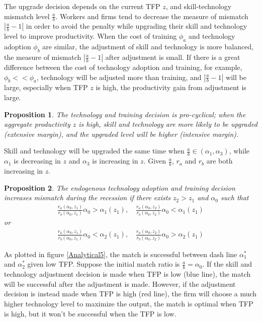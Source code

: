 \documentclass[12pt]{article}
\newtheorem{proposition}{Proposition}
\newcommand{\1}{\mathbb{1}}
\begin{document}
The upgrade decision depends on the current TFP $z$, and skill-technology mismatch level $\frac{a}{b}$. Workers and firms tend to decrease the measure of mismatch $|\frac{a}{b}-1|$ in order to avoid the penalty while upgrading their skill and technology level to improve productivity. When the cost of training $\phi_a$ and technology adoption $\phi_b$ are similar, the adjustment of skill and technology is more balanced, the measure of mismatch $|\frac{a}{b}-1|$ after adjustment is small. If there is a great difference between the cost of technology adoption and training, for example, $\phi_b<<\phi_a$, technology will be adjusted more than training, and $|\frac{a}{b}-1|$ will be large, especially when TFP $z$ is high, the productivity gain from adjustment is large.    

\begin{proposition}
The technology and training decision is pro-cyclical; when the aggregate productivity $z$ is high, skill and technology are more likely to be upgraded (extensive margin), and the upgraded level will be higher (intensive margin). 
\end{proposition}
Skill and technology will be upgraded the same time when $\frac{a}{b} \in (\alpha_1,\alpha_3)$, while $\alpha_1$ is decreasing in $z$ and $\alpha_3$ is increasing in $z$. Given $\frac{a}{b}$, $r_{a}$ and $r_{b}$ are both increasing in $z$. 

\begin{proposition}
The endogenous technology adoption and training decision increases mismatch during the recession if there exists $z_2>z_1$ and $\alpha_0$ such that 
\begin{align*}
\frac{r_a(\alpha_0,z_1)}{r_b(\alpha_0,z_1)}\alpha_0>\alpha_1(z_1), \quad \frac{r_a(\alpha_0,z_2)}{r_b(\alpha_0,z_2)}\alpha_0<\alpha_1(z_1)
\end{align*}
or 
\begin{align*}
\frac{r_a(\alpha_0,z_1)}{r_b(\alpha_0,z_1)}\alpha_0<\alpha_2(z_1),\quad \frac{r_a(\alpha_0,z_2)}{r_b(\alpha_0,z_2)}\alpha_0>\alpha_2(z_1)
\end{align*}
\end{proposition}
As plotted in figure \ref{Analytical5}, the match is successful between dash line $\alpha_1^*$ and $\alpha_2^*$ given low TFP. Suppose the initial match ratio is $\frac{a}{b} = \alpha_0$. If the skill and technology adjustment decision is made when TFP is low (blue line), the match will be successful after the adjustment is made. However, if the adjustment decision is instead made when TFP is high (red line), the firm will choose a much higher technology level to maximize the output, the match is optimal when TFP is high, but it won't be successful when the TFP is low.  
\end{document}
